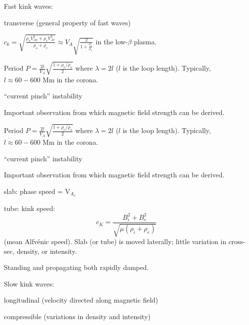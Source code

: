 \documentclass[12pt]{article}
\begin{document}
Fast kink waves:
\begin{itemize*}
    \item transverse (general property of fast waves)
    \item $c_k = \sqrt{\frac{\rho_oV^2_{Ao}+\rho_eV^2_{Ae}}
        {\rho_o+\rho_e}} \approx V_A\sqrt{\frac{2}{1+\frac{\rho_e}{\rho_o}}} $
        in the low-$\beta$ plasma.
    \item Period $P=\frac{2l}{V_A}\sqrt{\frac{1+\rho_e/\rho_o}{2}}$
        where $\lambda=2l$ ($l$ is the loop length).
        Typically, $l \approx 60-600$ Mm in the corona.
    \item ``current pinch'' instability
    \item Important observation from which magnetic field strength
        can be derived.
    \item Period $P=\frac{2l}{V_A}\sqrt{\frac{1+\rho_e/\rho_o}{2}}$
        where $\lambda=2l$ ($l$ is the loop length).
        Typically, $l \approx 60-600$ Mm in the corona.
    \item ``current pinch'' instability
    \item Important observation from which magnetic field strength
        can be derived.
    \item slab: phase speed = V$_{A_e}$
    \item tube: kink speed:
        $$ c_K = \frac{B_i^2 + B_e^2}{\sqrt{\mu(\rho_i+\rho_e)}} $$
        (mean Alfv\'enic speed).
        Slab (or tube) is moved laterally; little variation in cross-sec,
        density, or intensity.
\end{itemize*}
Standing and propagating both rapidly damped.


Slow kink waves:
\begin{itemize*}
    \item longitudinal (velocity directed along magnetic field)
    \item compressible (variations in density and intensity)
\end{itemize*}
\end{document}
